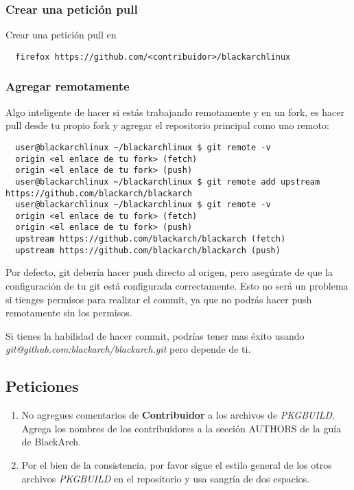 \documentclass[a4paper, oneside, 11pt]{book}
\def\href#1#2{\htmladdnormallink{#2}{#1}}
\begin{document}
\subsubsection{Crear una petición pull}
Crear una petición pull en \href{https://github.com/}{github.com}
\begin{lstlisting}
  firefox https://github.com/<contribuidor>/blackarchlinux
\end{lstlisting}

\subsubsection{Agregar remotamente}
Algo inteligente de hacer si estás trabajando remotamente y en un fork, es hacer pull desde tu propio fork y agregar el repositorio principal como uno remoto:
\begin{lstlisting}
  user@blackarchlinux ~/blackarchlinux $ git remote -v
  origin <el enlace de tu fork> (fetch)
  origin <el enlace de tu fork> (push)
  user@blackarchlinux ~/blackarchlinux $ git remote add upstream https://github.com/blackarch/blackarch
  user@blackarchlinux ~/blackarchlinux $ git remote -v
  origin <el enlace de tu fork> (fetch)
  origin <el enlace de tu fork> (push)
  upstream https://github.com/blackarch/blackarch (fetch)
  upstream https://github.com/blackarch/blackarch (push)
\end{lstlisting}

Por defecto, git debería hacer push directo al origen, pero asegúrate de que la
configuración de tu git está configurada correctamente. 
Esto no será un problema si tienges permisos para realizar el commit, 
ya que no podrás hacer push remotamente sin los permisos.

Si tienes la habilidad de hacer commit, podrías tener mas éxito usando
\textit{git@github.com:blackarch/blackarch.git} pero depende de ti.

\subsection{Peticiones}
\begin{enumerate}
\item No agregues comentarios de \textbf{Contribuidor} a los archivos de
\textit{PKGBUILD}. Agrega los nombres de los contribuidores a la sección
AUTHORS de la guía de BlackArch.
\item Por el bien de la consistencia, por favor sigue el estilo general de los otros
archivos \textit{PKGBUILD} en el repositorio y usa sangría de dos espacios.
\end{enumerate}
\end{document}
